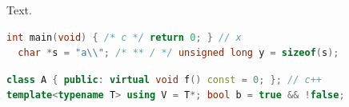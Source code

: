 \documentclass{article}
\begin{document}
Text.
\begin{lstlisting}[language=C]
int main(void) { /* c */ return 0; } // x
  char *s = "a\\"; /* ** / */ unsigned long y = sizeof(s);
\end{lstlisting}
\begin{lstlisting}[language=C++]
class A { public: virtual void f() const = 0; }; // c++
template<typename T> using V = T*; bool b = true && !false;
\end{lstlisting}
\end{document}
